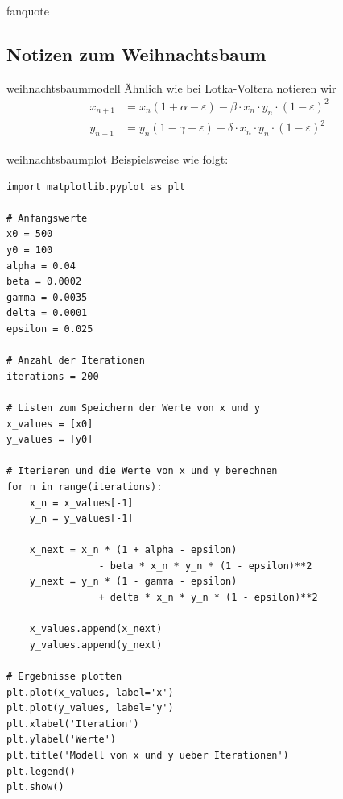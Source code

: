 \documentclass[%
<<<<<<< Updated upstream
<<<<<<< Updated upstream
11pt,%
twoside,%
titlepage,%
german,%
headsepline%
]{scrartcl}
\begin{document}
\begin{uebenv}{fanquote}
\clearpage

\subsection{Notizen zum Weihnachtsbaum}

\begin{lsg}{weihnachtsbaummodell}
Ähnlich wie bei Lotka-Voltera notieren wir
\begin{align*}
x_{n+1}&=x_n(1+\alpha-\varepsilon)-\beta\cdot x_n\cdot y_n\cdot(1-\varepsilon)^2\\
y_{n+1}&=y_n(1-\gamma-\varepsilon)+\delta\cdot x_n\cdot y_n\cdot(1-\varepsilon)^2
\end{align*}
\end{lsg}
\begin{lsg}{weihnachtsbaumplot}
Beispielsweise wie folgt:

\begin{lstlisting}
import matplotlib.pyplot as plt

# Anfangswerte
x0 = 500
y0 = 100
alpha = 0.04
beta = 0.0002
gamma = 0.0035
delta = 0.0001
epsilon = 0.025

# Anzahl der Iterationen
iterations = 200

# Listen zum Speichern der Werte von x und y
x_values = [x0]
y_values = [y0]

# Iterieren und die Werte von x und y berechnen
for n in range(iterations):
    x_n = x_values[-1]
    y_n = y_values[-1]
    
    x_next = x_n * (1 + alpha - epsilon) 
    			- beta * x_n * y_n * (1 - epsilon)**2
    y_next = y_n * (1 - gamma - epsilon) 
    			+ delta * x_n * y_n * (1 - epsilon)**2
    
    x_values.append(x_next)
    y_values.append(y_next)

# Ergebnisse plotten
plt.plot(x_values, label='x')
plt.plot(y_values, label='y')
plt.xlabel('Iteration')
plt.ylabel('Werte')
plt.title('Modell von x und y ueber Iterationen')
plt.legend()
plt.show()
\end{lstlisting}
\end{lsg}

\clearpage






\end{uebenv}
\end{document}

